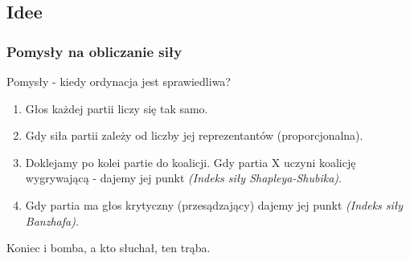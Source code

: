 \documentclass[8pt, brown]{beamer}
\begin{document}
		\subsection{Idee}
		\begin{frame}
			\frametitle{Pomysły na obliczanie siły}
			\begin{center}
				\color{darkmagenta}Pomysły - kiedy ordynacja jest sprawiedliwa?
			\end{center}
			\begin{enumerate}
			 \item Głos każdej partii liczy się tak samo.
			 \item Gdy siła partii zależy od liczby jej reprezentantów (proporcjonalna).
			 \item Doklejamy po kolei partie do koalicji. Gdy partia X uczyni koalicję wygrywającą - dajemy jej punkt \textit{(Indeks siły Shapleya-Shubika)}.
			 \item Gdy partia ma głos krytyczny (przesądzający) dajemy jej punkt \textit{(Indeks siły Banzhafa)}.
			\end{enumerate}

		\end{frame}

	\begin{frame}
		\begin{center}
			\LARGE\color{navyblue}Koniec i bomba, a kto słuchał, ten trąba.
		\end{center}
	\end{frame}
\end{document}
